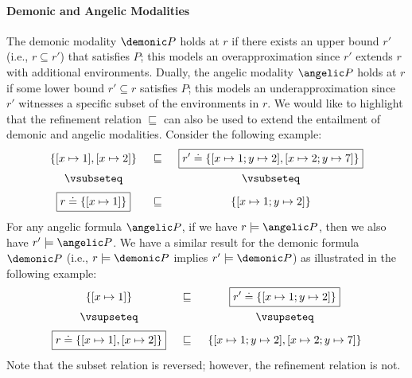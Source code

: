 \paragraph{Demonic and Angelic Modalities}
The demonic modality $\demonic P$ holds at $r$ if there exists an upper bound $r'$ (i.e., $r \subseteq r'$) that satisfies
$P$; this models an overapproximation since $r'$ extends $r$ with
additional environments.  Dually, the angelic modality $\angelic P$ holds at
$r$ if some lower bound $r' \subseteq r$ satisfies $P$;
this models an underapproximation since $r'$ witnesses a specific
subset of the environments in $r$. 
We would like to highlight that the refinement relation $\sqsubseteq$ can also be used to extend the entailment of demonic and angelic modalities. Consider the following example:
\begin{align*}
\begin{array}{c @{\hspace{1.5em}} c @{\hspace{1.5em}} c}
  {\{[x \mapsto 1], [x \mapsto 2]\}} & \sqsubseteq & {\boxed{r' \doteq \{[x \mapsto 1; y \mapsto 2], [x \mapsto 2; y \mapsto 7]\}}} \\[0.6em]
  \vsubseteq & & \vsubseteq \\[0.6em]
  {\boxed{r \doteq \{[x \mapsto 1]\}}} & \sqsubseteq & {\{[x \mapsto 1; y \mapsto 2]\}}
\end{array}
\end{align*}\noindent
For any angelic formula $\angelic P$, if we have $r \models \angelic P$, then we also have $r' \models \angelic P$. We have a similar result for the demonic formula $\demonic P$ (i.e., $r \models \demonic P$ implies $r' \models \demonic P$) as illustrated in the following example:
\begin{align*}
\begin{array}{c @{\hspace{1.5em}} c @{\hspace{1.5em}} c}
  {\{[x \mapsto 1]\}} & \sqsubseteq & {\boxed{r' \doteq \{[x \mapsto 1; y \mapsto 2]\}}} \\[0.6em]
  \vsupseteq & & \vsupseteq \\[0.6em]
  {\boxed{r \doteq \{[x \mapsto 1], [x \mapsto 2]\}}} & \sqsubseteq & {\{[x \mapsto 1; y \mapsto 2], [x \mapsto 2; y \mapsto 7]\}}
\end{array}
\end{align*}\noindent
Note that the subset relation is reversed; however, the refinement relation is not.


